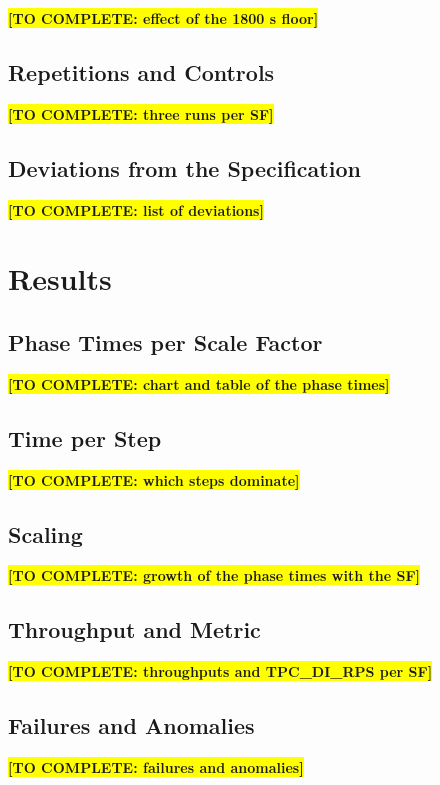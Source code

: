\documentclass[11pt,a4paper]{article}
\newcommand{\todo}[1]{\colorbox{yellow}{\textbf{[TO COMPLETE: #1]}}}
\begin{document}
\todo{effect of the 1800 s floor}

\subsection{Repetitions and Controls}
\todo{three runs per SF}

\subsection{Deviations from the Specification}
\todo{list of deviations}

\section{Results}
\label{sec:results}

\subsection{Phase Times per Scale Factor}
\todo{chart and table of the phase times}

\subsection{Time per Step}
\todo{which steps dominate}

\subsection{Scaling}
\todo{growth of the phase times with the SF}

\subsection{Throughput and Metric}
\label{sec:metricresults}
\todo{throughputs and TPC\_DI\_RPS per SF}

\subsection{Failures and Anomalies}
\todo{failures and anomalies}
\end{document}
